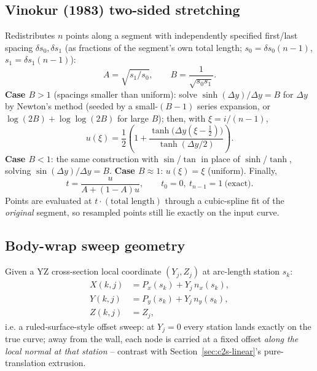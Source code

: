 \documentclass[11pt]{article}
\begin{document}
\subsection{Vinokur (1983) two-sided stretching}
\label{sec:vinokur}
Redistributes \(n\) points along a segment with independently
specified first/last spacing \(\delta s_0, \delta s_1\) (as fractions
of the segment's own total length; \(s_0 = \delta s_0 (n-1)\),
\(s_1 = \delta s_1(n-1)\)):
\begin{equation}
A = \sqrt{s_1/s_0}, \qquad B = \frac{1}{\sqrt{s_0 s_1}} .
\end{equation}
\textbf{Case \(B>1\)} (spacings smaller than uniform): solve
\(\sinh(\Delta y)/\Delta y = B\) for \(\Delta y\) by Newton's method
(seeded by a small-\((B-1)\) series expansion, or
\(\log(2B)+\log\log(2B)\) for large \(B\)); then, with
\(\xi = i/(n-1)\),
\begin{equation}
u(\xi) = \frac{1}{2}\left(1 + \frac{\tanh\!\big(\Delta y(\xi - \tfrac12)\big)}{\tanh(\Delta y/2)}\right).
\end{equation}
\textbf{Case \(B<1\)}: the same construction with \(\sin\)/\(\tan\) in
place of \(\sinh\)/\(\tanh\), solving \(\sin(\Delta y)/\Delta y = B\).
\textbf{Case \(B\approx1\)}: \(u(\xi) = \xi\) (uniform). Finally,
\begin{equation}
t = \frac{u}{A + (1-A)u}, \qquad t_0 = 0,\ t_{n-1} = 1 \ \text{(exact)} .
\end{equation}
Points are evaluated at \(t\cdot(\text{total length})\) through a
cubic-spline fit of the \emph{original} segment, so resampled points
still lie exactly on the input curve.

\subsection{Body-wrap sweep geometry}
\label{sec:etagrid-sweep}
Given a YZ cross-section local coordinate \((Y_j, Z_j)\) at arc-length
station \(s_k\):
\begin{align}
X(k,j) &= P_x(s_k) + Y_j\, n_x(s_k), \\
Y(k,j) &= P_y(s_k) + Y_j\, n_y(s_k), \\
Z(k,j) &= Z_j,
\end{align}
i.e. a ruled-surface-style offset sweep: at \(Y_j=0\) every station
lands exactly on the true curve; away from the wall, each node is
carried at a fixed offset \emph{along the local normal at that
station} -- contrast with Section~\ref{sec:c2s-linear}'s pure-translation
extrusion.
\end{document}

